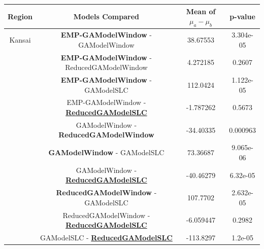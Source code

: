 \begin{table}[!htb]
	\begin{center}
		\begin{tabular}{|c|c|c|c|}
			\hline
			\multicolumn{1}{|c|}{Region} &
			\multicolumn{1}{|c|}{Models Compared} & \multicolumn{1}{|c|}{Mean of $\mu_a - \mu_b$}&
			\multicolumn{1}{|c|}{p-value} \\
			\hline
			
			Kansai & \textbf{EMP-GAModelWindow} - GAModelWindow &
			 38.67553 &  3.304e-05 \\
			
		    & \textbf{EMP-GAModelWindow} - ReducedGAModelWindow & 4.272185  & 0.2607\\
			
			& \textbf{EMP-GAModelWindow} - GAModelSLC & 
			112.0424 &  1.122e-05\\

			&EMP-GAModelWindow - \underline{\textbf{ReducedGAModelSLC}} &  
			-1.787262 & 0.5673 \\
			
			& GAModelWindow - \textbf{ReducedGAModelWindow} &
			-34.40335 & 0.000963\\
			
			& \textbf{GAModelWindow} - GAModelSLC &
			 73.36687  &9.065e-06\\
				
			& GAModelWindow - \underline{\textbf{ReducedGAModelSLC}} &
			-40.46279 & 6.32e-05\\
				
			& \textbf{ReducedGAModelWindow} - GAModelSLC &
			107.7702  & 2.632e-05\\

			& ReducedGAModelWindow - \underline{\textbf{ReducedGAModelSLC}} &
			-6.059447 &0.2982\\

			& GAModelSLC - \underline{\textbf{ReducedGAModelSLC}} &
			-113.8297 & 1.2e-05\\


\end{tabular}
\end{center}
\end{table}

